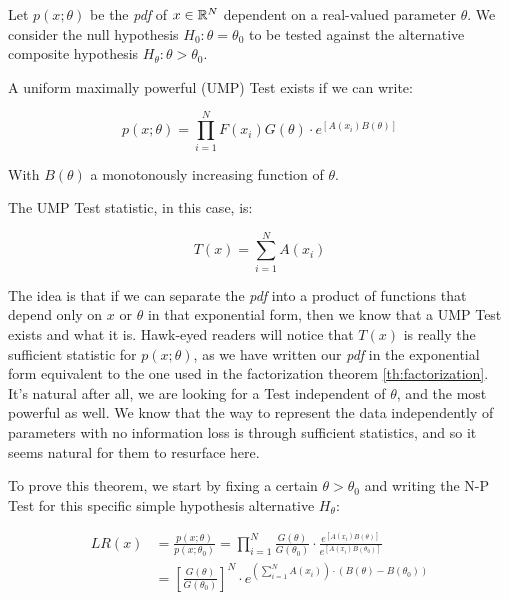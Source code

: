 \begin{theorem}
	Let $p(x;\theta)$ be the \emph{pdf} of $x\in\mathbb{R}^N$ dependent on a real-valued parameter $\theta$. We consider the null hypothesis $H_0: \theta= \theta_0$ to be tested against the alternative composite hypothesis $H_\theta : \theta > \theta_0$.
	
	A uniform maximally powerful (UMP) Test exists if we can write:
	
	\[
	p(x;\theta) = \prod_{i=1}^N F(x_i)G(\theta)\cdot e^{\left[A(x_i)B(\theta)\right]}
	\] 
	
	With $B(\theta)$ a monotonously increasing function of $\theta$.
	
	The UMP Test statistic, in this case, is:
	
	\[
	T(x) = \sum_{i=1}^NA(x_i)
	\]
\end{theorem}

The idea is that if we can separate the \emph{pdf} into a product of functions that depend only on $x$ or $\theta$ in that exponential form, then we know that a UMP Test exists and what it is. Hawk-eyed readers will notice that $T(x)$ is really the sufficient statistic for $p(x;\theta)$, as we have written our \emph{pdf} in the exponential form equivalent to the one used in the factorization theorem \ref{th:factorization}. It's natural after all, we are looking for a Test independent of $\theta$, and the most powerful as well. We know that the way to represent the data independently of parameters with no information loss is through sufficient statistics, and so it seems natural for them to resurface here.

To prove this theorem, we start by fixing a certain $\theta>\theta_0$ and writing the N-P Test for this specific simple hypothesis alternative $H_\theta$:

\begin{align*}
	LR(x) &= \frac{p(x;\theta)}{p(x;\theta_0)} = \prod_{i=1}^N \frac{G(\theta)}{G(\theta_0)}\cdot \frac{e^{\left[A(x_i)B(\theta)\right]}}{e^{\left[A(x_i)B(\theta_0)\right]}}\\
	&=\left[\frac{G(\theta)}{G(\theta_0)}\right]^N\cdot e^{\left(\sum_{i=1}^N A(x_i)\right)\cdot\left(B(\theta)-B(\theta_0)\right)}
\end{align*}

